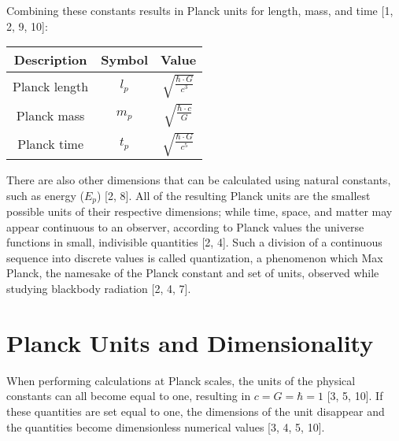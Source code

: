 \documentclass[paper=a4, fontsize=12pt]{scrartcl} %
\numberwithin{equation}{section} %
\numberwithin{figure}{section} %
\numberwithin{table}{section} %
\begin{document}
\vspace{0.75cm}

Combining these constants results in Planck units for length, mass, and time [1, 2, 9, 10]: 

\vspace{0.5cm}
\begin{center}
\begin{tabular}{ccc}
    \hline
    Description & Symbol & Value            \\ \hline
    Planck length   &    $l_p$               & $\sqrt{\frac{\hbar \cdot G}{c^3}}$                    \\
    Planck mass    &   $m_p$       &           $\sqrt{\frac{\hbar \cdot c}{G}}$                      \\
    Planck time       & $t_p$          &       $\sqrt{\frac{\hbar \cdot G}{c^5}}$               \\
 \end{tabular}
 \end{center}
 \vspace{0.75cm}
 
There are also other dimensions that can be calculated using natural constants, such as energy ($E_p$) [2, 8]. All of the resulting Planck units are the smallest possible units of their respective dimensions; while time, space, and matter may appear continuous to an observer, according to Planck values the universe functions in small, indivisible quantities [2, 4]. Such a division of a continuous sequence into discrete values is called quantization, a phenomenon which Max Planck, the namesake of the Planck constant and set of units, observed while studying blackbody radiation [2, 4, 7].


\section{Planck Units and Dimensionality}

When performing calculations at Planck scales, the units of the physical constants can all become equal to one, resulting in $c = G = \hbar = 1$ [3, 5, 10]. If these quantities are set equal to one, the dimensions of the unit disappear and the quantities become dimensionless numerical values [3, 4, 5, 10].
\end{document}
